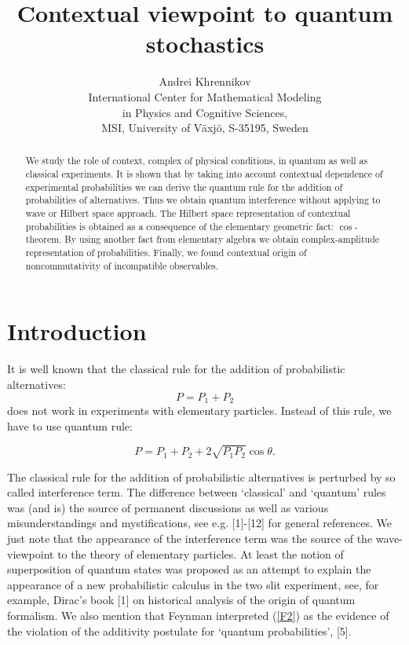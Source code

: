 \documentclass[12pt,oneside,final,a4paper]{article}
\title{Contextual viewpoint to quantum stochastics}
\author{Andrei Khrennikov\\
International Center for Mathematical Modeling\\
 in Physics and Cognitive Sciences,\\
 MSI, University of V\"axj\"o, S-35195, Sweden}
\begin{document}
\maketitle


\begin{abstract}
We study the role of context, complex of physical conditions,
in  quantum as well as classical experiments. It is shown that 
by taking into account contextual dependence of experimental
probabilities we can derive the quantum rule for the addition
of probabilities of alternatives. Thus we obtain quantum interference
without applying to wave or Hilbert space approach. The Hilbert
space representation of contextual probabilities is obtained
as  a consequence of the elementary geometric fact:
$\cos$-theorem. By using another fact from elementary algebra
we obtain complex-amplitude representation of probabilities.
Finally, we found contextual origin of noncommutativity
of incompatible observables.



\end{abstract}





 
 
 
\section{Introduction}



It is well known that the classical rule for the addition of probabilistic alternatives:
\begin{equation}
\label{F1}
P=P_1+P_2
\end{equation}
does not work in experiments with elementary particles. Instead of this rule, we have to use quantum rule:

\begin{equation}
\label{F2}
P=P_1+P_2+2\sqrt{P_1P_2}\cos\theta.
\end{equation}

The classical rule for the addition of probabilistic alternatives is perturbed by so called 
interference term. The difference between `classical' and `quantum' rules was (and is) the source of
permanent discussions as well as various misunderstandings and mystifications, see e.g. [1]-[12]
for general
references. We just note that the appearance
of the interference term was the source of the wave-viewpoint to the theory of elementary particles.
At least the notion of superposition of quantum states was proposed as an attempt to explain the appearance
of a new probabilistic calculus in the two slit experiment, see, for example, Dirac's book [1] on historical 
analysis of the origin of quantum formalism. We also mention that Feynman interpreted (\ref{F2}) as the evidence
of the violation of the additivity postulate for `quantum probabilities', [5].
\end{document}

